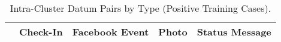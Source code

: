 \begin{table}[htp]
	\begin{center}
	\caption{Intra-Cluster Datum Pairs by Type (Positive Training Cases).}
	\label{tab:table_xtype_cluster}
		\begin{tabular}{r r r r r }
		\toprule
			 & Check-In & Facebook Event & Photo & Status Message\\
		\bottomrule
		\end{tabular}
	\end{center}
\end{table}